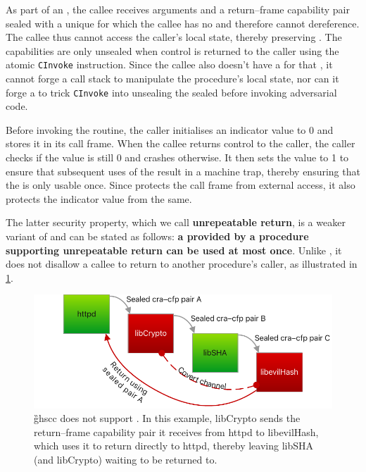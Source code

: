 \documentclass[main.tex]{subfiles}
\begin{document}
As part of an , the callee receives arguments and a return–frame capability pair sealed with a unique  for which the callee has no  and therefore cannot dereference. The callee thus cannot access the caller's local state, thereby preserving . The capabilities are only unsealed when control is returned to the caller using the atomic \texttt{CInvoke} instruction. Since the callee also doesn't have a  for that , it cannot forge a call stack to manipulate the procedure's local state, nor can it forge a  to trick \texttt{CInvoke} into unsealing the sealed  before invoking adversarial code.

Before invoking the  routine, the caller initialises an indicator value to 0 and stores it in its call frame. When the callee returns control to the caller, the caller checks if the value is still 0 and crashes otherwise. It then sets the value to 1 to ensure that subsequent uses of the  result in a machine trap, thereby ensuring that the  is only usable once. Since  protects the call frame from external access, it also protects the indicator value from the same.

The latter security property, which we call \textbf{unrepeatable return}, is a weaker variant of  and can be stated as follows: \textbf{a  provided by a procedure supporting unrepeatable return can be used at most once}. Unlike , it does not disallow a callee to return to another procedure's caller, as illustrated in \cref{fig:no-wbcf}.

\begin{figure}
	\centering
	\includegraphics{Images/Semi-WBCF.pdf}
	\caption{\G{ghscc} does not support . In this example, libCrypto sends the return–frame capability pair it receives from httpd to libevilHash, which uses it to return directly to httpd, thereby leaving libSHA (and libCrypto) waiting to be returned to.}
	\label{fig:no-wbcf}
\end{figure}
\end{document}
